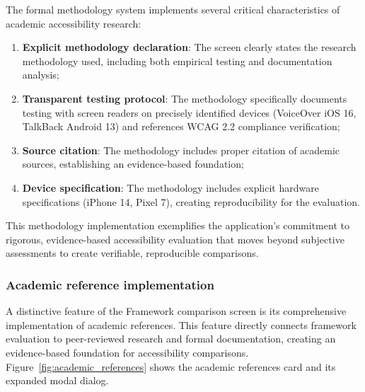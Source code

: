 \FloatBarrier

The formal methodology system implements several critical characteristics of academic accessibility research:

\begin{enumerate}
    \item \textbf{Explicit methodology declaration}: The screen clearly states the research methodology used, including both empirical testing and documentation analysis;
    
    \item \textbf{Transparent testing protocol}: The methodology specifically documents testing with screen readers on precisely identified devices (VoiceOver iOS 16, TalkBack Android 13) and references WCAG 2.2 compliance verification;
    
    \item \textbf{Source citation}: The methodology includes proper citation of academic sources, establishing an evidence-based foundation;
    
    \item \textbf{Device specification}: The methodology includes explicit hardware specifications (iPhone 14, Pixel 7), creating reproducibility for the evaluation.
\end{enumerate}

This methodology implementation exemplifies the application's commitment to rigorous, evidence-based accessibility evaluation that moves beyond subjective assessments to create verifiable, reproducible comparisons.

\subsubsection{Academic reference implementation}

A distinctive feature of the Framework comparison screen is its comprehensive implementation of academic references. This feature directly connects framework evaluation to peer-reviewed research and formal documentation, creating an evidence-based foundation for accessibility comparisons. Figure~\ref{fig:academic_references} shows the academic references card and its expanded modal dialog.

